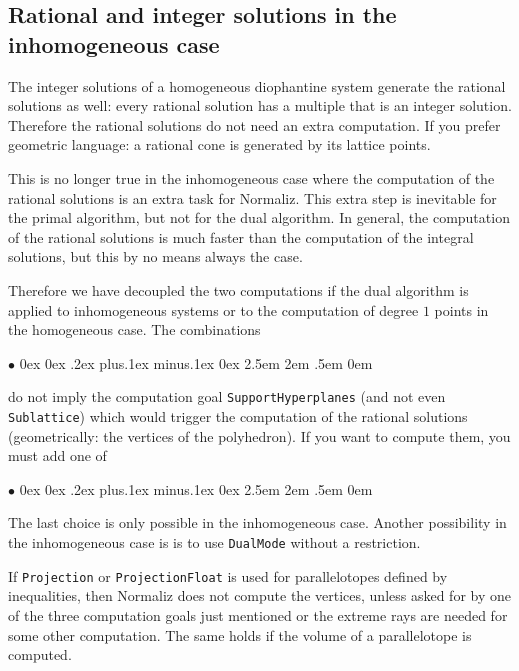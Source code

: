 \documentclass[12pt,a4paper]{scrartcl}
\newcommand{\stdli}{ \topsep0ex \partopsep0ex %
\parsep.2ex plus.1ex minus.1ex \itemsep0ex%
\leftmargin2.5em \labelwidth2em \labelsep.5em \rightmargin0em}%
\renewenvironment{itemize}{\begin{list}{{$\bullet$}}{\stdli}}{\end{list}}
\theoremstyle{definition}
\def\itemtt[#1]{\item[\textbf{\ttt{#1}}]}
\def\ttt{\texttt}
\begin{document}
\subsection{Rational and integer solutions in the inhomogeneous case}\label{InhomDual}

The integer solutions of a homogeneous diophantine system generate the rational solutions as well: every rational solution has a multiple that is an integer solution. Therefore the rational solutions do not need an extra computation. If you prefer geometric language: a rational cone is generated by its lattice points.

This is no longer true in the inhomogeneous case where the computation of the rational solutions is an extra task for Normaliz. This extra step is inevitable for the primal algorithm, but not for the dual algorithm. In general, the computation of the rational solutions is much faster than the computation of the integral solutions, but this by no means always the case.

Therefore we have decoupled the two computations if the dual algorithm is applied to inhomogeneous systems or to the computation of degree $1$ points in the homogeneous case. The combinations
\begin{itemize}
	\itemtt[DualMode HilbertBasis, -dN]
	
	\itemtt[DualMode Deg1Elements, -d1]
	
	\itemtt[DualMode ModuleGenerators]
	
	\itemtt[DualMode LatticePoints]
	
\end{itemize}
do not imply the computation goal \verb|SupportHyperplanes| (and not even \verb|Sublattice|) which would trigger the computation of the rational solutions (geometrically: the vertices of the polyhedron). If you want to compute them, you must add one of
\begin{itemize}
	\itemtt[SupportHyperplanes, -s]
	
	\itemtt[ExtremeRays]
	
	\itemtt[VerticesOfPolyhedron]
\end{itemize}
The last choice is only possible in the inhomogeneous case. Another possibility in the inhomogeneous case is is to use \verb|DualMode| without a restriction.

If \verb|Projection| or \verb|ProjectionFloat| is used for parallelotopes defined by inequalities, then Normaliz does not compute the vertices, unless asked for by one of the three computation goals just mentioned or the extreme rays are needed for some other computation. The same holds if the volume of a parallelotope is computed.
\end{document}
